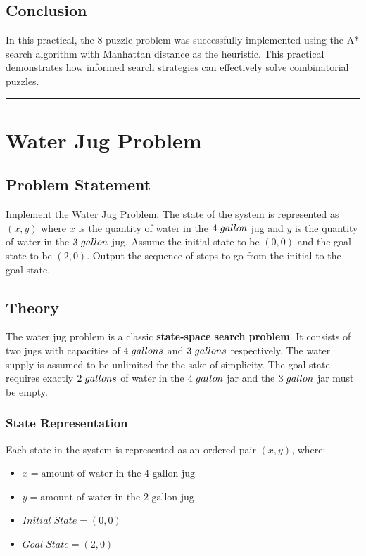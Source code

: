 \documentclass[12pt,a4paper]{report}
\newcommand{\divline}{
    \vspace{1em}
    \begin{center}
        \rule{0.8\textwidth}{0.6pt}
    \end{center}
    \vspace{1em}
}
\begin{document}
\section{Conclusion}
In this practical, the 8-puzzle problem was successfully implemented using the A*
search algorithm with Manhattan distance as the heuristic. This practical demonstrates
how informed search strategies can effectively solve combinatorial puzzles.
\\
\divline
\chapter{Water Jug Problem}

\section{Problem Statement}
Implement the Water Jug Problem. The state of the system is represented as $(x,y)$ where $x$
is the quantity of water in the $4\hspace{0.3em} gallon$ jug and $y$ is the quantity of water in the
$3\hspace{0.3em} gallon$ jug. Assume the initial state to be $(0,0)$ and the goal state to be $(2,0)$.
Output the sequence of steps to go from the initial to the goal state.

\section{Theory}
The water jug problem is a classic \textbf{state-space search problem}. It consists of two jugs
with capacities of $4\hspace{0.3em} gallons$ and $3\hspace{0.3em} gallons$ respectively. The water
supply is assumed to be unlimited for the sake of simplicity. The goal state requires exactly $2 \hspace{0.3em} gallons$
of water in the $4 \hspace{0.3em} gallon$ jar and the $3 \hspace{0.3em} gallon$ jar must be empty.

\subsection{State Representation}
Each state in the system is represented as an ordered pair $(x,y)$, where:

\begin{itemize}
        \item $x = \text{amount of water in the 4-gallon jug}$
        \item $y = \text{amount of water in the 2-gallon jug}$
        \item $Initial \; State = (0,0)$
        \item $Goal \; State = (2,0)$
\end{itemize}
\end{document}
